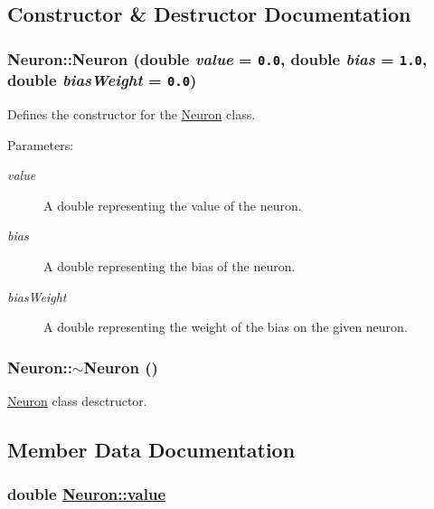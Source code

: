 \subsection{Constructor \& Destructor Documentation}
\hypertarget{classNeuron_c35024fa3eea9421afabdda2e59cd1aa}{
\subsubsection[Neuron]{\setlength{\rightskip}{0pt plus 5cm}Neuron::Neuron (double {\em value} = {\tt 0.0}, double {\em bias} = {\tt 1.0}, double {\em bias\-Weight} = {\tt 0.0})}}
\label{classNeuron_c35024fa3eea9421afabdda2e59cd1aa}


Defines the constructor for the \hyperlink{classNeuron}{Neuron} class. \begin{Desc}
\item[Parameters:]
\begin{description}
\item[{\em value}]A double representing the value of the neuron. \item[{\em bias}]A double representing the bias of the neuron. \item[{\em bias\-Weight}]A double representing the weight of the bias on the given neuron. \end{description}
\end{Desc}
\hypertarget{classNeuron_94a250ce7e167760e593979b899745b1}{
\subsubsection[$\sim$Neuron]{\setlength{\rightskip}{0pt plus 5cm}Neuron::$\sim$Neuron ()}}
\label{classNeuron_94a250ce7e167760e593979b899745b1}


\hyperlink{classNeuron}{Neuron} class desctructor. 

\subsection{Member Data Documentation}
\hypertarget{classNeuron_e1988ffe53bfd53ce979aecf01a164e3}{
\subsubsection[value]{\setlength{\rightskip}{0pt plus 5cm}double \hyperlink{classNeuron_e1988ffe53bfd53ce979aecf01a164e3}{Neuron::value}}}
\label{classNeuron_e1988ffe53bfd53ce979aecf01a164e3}


